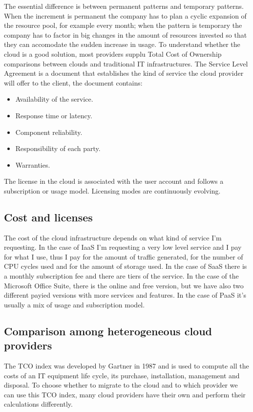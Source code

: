 The essential difference is between permanent patterns and temporary patterns. When the increment is permanent the company has to plan a cyclic expansion of the resource pool, for example every month; when the pattern is temporary the company has to factor in big changes in the amount of resources invested so that they can accomodate the sudden increase in usage. \n
To understand whether the cloud is a good solution, most providers supplu Total Cost of Ownership comparisons between clouds and traditional IT infrastructures. \n
The Service Level Agreement is a document that establishes the kind of service the cloud provider will offer to the client, the document contains:
\begin{itemize}
    \item Availability of the service.
    \item Response time or latency.
    \item Component reliability.
    \item Responsibility of each party.
    \item Warranties.
\end{itemize}
The license in the cloud is associated with the user account and follows a subscription or usage model. Licensing modes are continuously evolving.
\subsection{Cost and licenses}
The cost of the cloud infrastructure depends on what kind of service I'm requesting. \n
In the case of IaaS I'm requesting a very low level service and I pay for what I use, thus I pay for the amount of traffic generated, for the number of CPU cycles used and for the amount of storage used. \n
In the case of SaaS there is a monthly subscription fee and there are tiers of the service. In the case of the Microsoft Office Suite, there is the online and free version, but we have also two different payied versions with more services and features. \n
In the case of PaaS it's usually a mix of usage and subscription model.
\subsection{Comparison among heterogeneous cloud providers}
The TCO index was developed by Gartner in 1987 and is used to compute all the costs of an IT equipment life cycle, its purchase, installation, management and disposal. \n
To choose whether to migrate to the cloud and to which provider we can use this TCO index, many cloud providers have their own and perform their calculations differently. \n